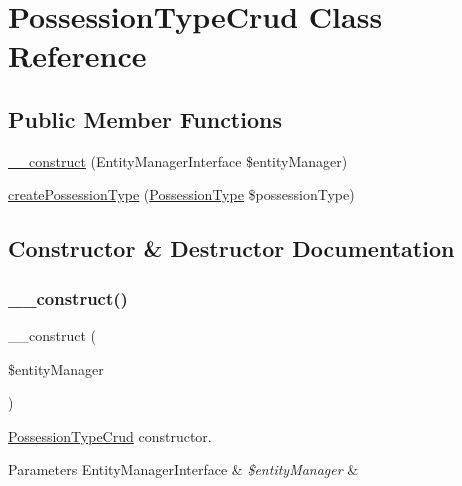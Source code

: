 \hypertarget{class_app_1_1_d_a_l_1_1_possession_type_crud}{}\section{Possession\+Type\+Crud Class Reference}
\label{class_app_1_1_d_a_l_1_1_possession_type_crud}
\subsection*{Public Member Functions}
\begin{DoxyCompactItemize}
\item 
\mbox{\hyperlink{class_app_1_1_d_a_l_1_1_possession_type_crud_abb5fb9a65dd8a81e7482dddbf71c5177}{\+\_\+\+\_\+construct}} (Entity\+Manager\+Interface \$entity\+Manager)
\item 
\mbox{\hyperlink{class_app_1_1_d_a_l_1_1_possession_type_crud_a76df75632aa1a562fe18429270ba0e5c}{create\+Possession\+Type}} (\mbox{\hyperlink{class_app_1_1_entity_1_1_possession_type}{Possession\+Type}} \$possession\+Type)
\end{DoxyCompactItemize}


\subsection{Constructor \& Destructor Documentation}
\mbox{\label{class_app_1_1_d_a_l_1_1_possession_type_crud_abb5fb9a65dd8a81e7482dddbf71c5177}} 
\subsubsection{\texorpdfstring{\_\_construct()}{\_\_construct()}}
{\footnotesize\ttfamily \+\_\+\+\_\+construct (\begin{DoxyParamCaption}\item[{Entity\+Manager\+Interface}]{\$entity\+Manager }\end{DoxyParamCaption})}

\mbox{\hyperlink{class_app_1_1_d_a_l_1_1_possession_type_crud}{Possession\+Type\+Crud}} constructor. 
\begin{DoxyParams}[1]{Parameters}
Entity\+Manager\+Interface & {\em \$entity\+Manager} & \\
\hline
\end{DoxyParams}


